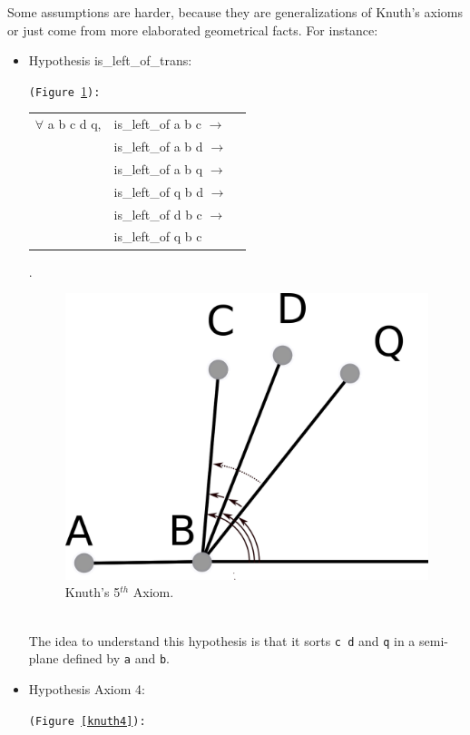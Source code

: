 \documentclass[a4paper,10pt]{article}
\def\hypothesis#1#2{{\color{purple}Hypothesis} {\color{blue}#1}: {\tt #2}}
\begin{document}
Some assumptions are harder, because they are generalizations of Knuth's axioms or just come from more elaborated geometrical facts. For instance:
\begin{itemize}
\item \hypothesis{is\_left\_of\_trans}{(Figure \ref{knuth5}):\\  \begin{tabular}{lll}
                                          $\forall$ a b c d q, &is\_left\_of a b c $\rightarrow$\\
                                           &is\_left\_of a b d $\rightarrow$\\
                                           &is\_left\_of a b q $\rightarrow$\\
                                           &is\_left\_of q b d $\rightarrow$\\
                                           &is\_left\_of d b c $\rightarrow$\\
                                           &is\_left\_of q b c 
           \end{tabular} }.
\\
\begin{figure}
\centering
\includegraphics[scale=2]{Axiom5}
\caption{\label{knuth5} Knuth's 5$^{th}$ Axiom.}
\end{figure}\\
The idea to understand this hypothesis is that it sorts {\tt c d} and {\tt q} in a semi-plane defined by {\tt a} and {\tt b}.
\item \hypothesis{Axiom 4}{(Figure \ref{knuth4}):\\ \begin{tabular}{ll}

\end{tabular}}
\end{itemize}
\end{document}
